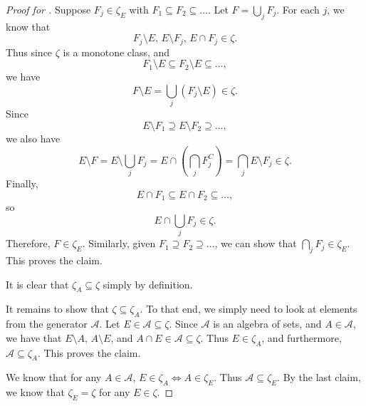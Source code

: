 \documentclass[notoc,notitlepage]{tufte-book}
\begin{document}
\begin{proof}[Proof for ]
  \noindent
  Suppose $F_j \in \zeta_E$ with $F_1 \subseteq F_2 \subseteq \hdots$.
  Let $F = \bigcup_{j} F_j$.
  For each $j$, we know that
  \begin{equation*}
    F_j \setminus E,\, E \setminus F_j,\, E \cap F_j \in \zeta.
  \end{equation*}
  Thus since $\zeta$ is a monotone class, and
  \begin{equation*}
    F_1 \setminus E \subseteq F_2 \setminus E \subseteq \hdots,
  \end{equation*}
  we have
  \begin{equation*}
    F \setminus E = \bigcup_{j} ( F_j \setminus E ) \in \zeta.
  \end{equation*}
  Since
  \begin{equation*}
    E \setminus F_1 \supseteq E \setminus F_2 \supseteq \hdots,
  \end{equation*}
  we also have
  \begin{equation*}
    E \setminus F = E \setminus \bigcup_{j} F_j
          = E \cap \left( \bigcap_{j} F_j^C \right)
          = \bigcap_{j} E \setminus F_j \in \zeta.
  \end{equation*}
  Finally,
  \begin{equation*}
    E \cap F_1 \subseteq E \cap F_2 \subseteq \hdots,
  \end{equation*}
  so
  \begin{equation*}
    E \cap \bigcup_{j} F_j \in \zeta.
  \end{equation*}
  Therefore, $F \in \zeta_E$.
  Similarly, given $F_1 \supseteq F_2 \supseteq \hdots$,
  we can show that $\bigcap_{j} F_j \in \zeta_E$.
  This proves the claim. \dashv

  \noindent
  It is clear that $\zeta_A \subseteq \zeta$ simply by definition.

  It remains to show that $\zeta \subseteq \zeta_A$.
  To that end, we simply need to look at
  elements from the generator $\mathcal{A}$.
  Let $E \in \mathcal{A} \subseteq \zeta$.
  Since $\mathcal{A}$ is an algebra of sets,
  and $A \in \mathcal{A}$, we have that $E \setminus A,\, A \setminus E$,
  and $A \cap E \in \mathcal{A} \subseteq \zeta$.
  Thus $E \in \zeta_A$, and furthermore, $\mathcal{A} \subseteq \zeta_A$.
  This proves the claim. \dashv

  \noindent
  We know that for any $A \in \mathcal{A}$,
  $E \in \zeta_A \iff A \in \zeta_E$. Thus $\mathcal{A} \subseteq \zeta_E$.
  By the last claim, we know that $\zeta_E = \zeta$ for any $E \in \zeta$.
  \dashv


\end{proof}
\end{document}
